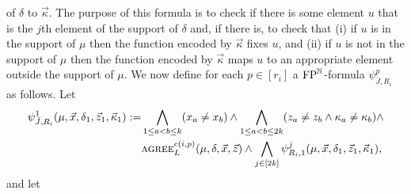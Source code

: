 \documentclass[../main/thesis.tex]{subfiles}
\begin{document}
of $\delta$ to $\vec{\kappa}$. The purpose of this formula is to check if there
is some element $u$ that is the $j$th element of the support of $\delta$ and, if
there is, to check that (i) if $u$ is in the support of $\mu$ then the function
encoded by $\vec{\kappa}$ fixes $u$, and (ii) if $u$ is not in the support of
$\mu$ then the function encoded by $\vec{\kappa}$ maps $u$ to an appropriate
element outside the support of $\mu$. We now define for each $p \in [r_i]$ a
$\text{\upshape FP}^{\mathbb{N}}$-formula $\psi^p_{\bar{J}, R_i}$ as follows. Let
\begin{align*}
  \psi^1_{\bar{J}, R_i} (\mu, \vec{x}, \delta_1, \vec{z}_1, \vec{\kappa}_1) := & \bigwedge_{1 \leq a < b \leq k} (x_a \neq x_b) \land \bigwedge_{1 \leq a < b \leq 2k}(z_a \neq z_b \land \kappa_a \neq \kappa_b) \land \\ & \textsc{agree}^{c(i, p)}_L(\mu,\delta, \vec{x}, \vec{z}) \land \bigwedge_{j \in [2k]} \psi^j_{R_i, 1}(\mu, \vec{x}, \delta_1, \vec{z}_1, \vec{\kappa}_1),
\end{align*}
and let
\end{document}

